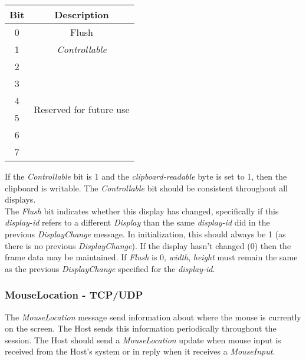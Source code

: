 \documentclass[11pt o]{article}
\begin{document}
    \begin{center}
        \begin{tabular}{|c|c|}
            \hline
            \textbf{Bit} & \textbf{Description}                        \\
            \hline
            0            & Flush                                       \\
            \hline
            1            & \emph{Controllable}                         \\
            \hline
            2            & \multirow{6}{10em}{Reserved for future use} \\
            3            &                                             \\
            4            &                                             \\
            5            &                                             \\
            6            &                                             \\
            7            &                                             \\
            \hline
        \end{tabular}
    \end{center}

    If the \emph{Controllable} bit is 1 and the \emph{clipboard-readable} byte is set to 1, then the clipboard is writable. The \emph{Controllable} bit should be consistent throughout all displays.\\

    The \emph{Flush} bit indicates whether this display has changed, specifically if this \emph{display-id} refers to a different \emph{Display} than the same \emph{display-id} did in the previous \emph{DisplayChange} message. In initialization, this should always be 1 (as there is no previous \emph{DisplayChange}). If the display hasn't changed (0) then the frame data may be maintained. If \emph{Flush} is 0, \emph{width}, \emph{height} must remain the same as the previous \emph{DisplayChange} specified for the \emph{display-id}.

    \subsubsection{MouseLocation - TCP/UDP}

    The \emph{MouseLocation} message send information about where the mouse is currently on the screen. The Host sends this information periodically throughout the session. The Host should send a \emph{MouseLocation} update when mouse input is received from the Host's system or in reply when it receives a \emph{MouseInput}.
\end{document}
